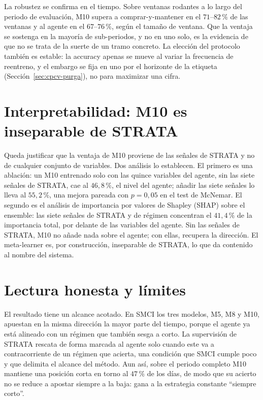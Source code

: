 La robustez se confirma en el tiempo. Sobre ventanas rodantes a lo largo del periodo de evaluación, M10 supera a comprar-y-mantener en el $71$--$82\,\%$ de las ventanas y al agente en el $67$--$76\,\%$, según el tamaño de ventana. Que la ventaja se sostenga en la mayoría de sub-periodos, y no en uno solo, es la evidencia de que no se trata de la suerte de un tramo concreto. La elección del protocolo también es estable: la accuracy apenas se mueve al variar la frecuencia de reentreno, y el embargo se fija en uno por el horizonte de la etiqueta (Sección~\ref{sec:cpcv-purga}), no para maximizar una cifra.


\section{Interpretabilidad: M10 es inseparable de STRATA}
\label{sec:interpretabilidad}

Queda justificar que la ventaja de M10 proviene de las señales de STRATA y no de cualquier conjunto de variables. Dos análisis lo establecen. El primero es una ablación: un M10 entrenado solo con las quince variables del agente, sin las siete señales de STRATA, cae al $46{,}8\,\%$, el nivel del agente; añadir las siete señales lo lleva al $55{,}2\,\%$, una mejora pareada con $p = 0{,}05$ en el test de McNemar. El segundo es el análisis de importancia por valores de Shapley (SHAP) \cite{lundberg2017} sobre el ensemble: las siete señales de STRATA y de régimen concentran el $41{,}4\,\%$ de la importancia total, por delante de las variables del agente. Sin las señales de STRATA, M10 no añade nada sobre el agente; con ellas, recupera la dirección. El meta-learner es, por construcción, inseparable de STRATA, lo que da contenido al nombre del sistema.


\section{Lectura honesta y límites}
\label{sec:lectura}

El resultado tiene un alcance acotado. En SMCI los tres modelos, M5, M8 y M10, apuestan en la misma dirección la mayor parte del tiempo, porque el agente ya está alineado con un régimen que también sesga a corto. La supervisión de STRATA rescata de forma marcada al agente solo cuando este va a contracorriente de un régimen que acierta, una condición que SMCI cumple poco y que delimita el alcance del método. Aun así, sobre el periodo completo M10 mantiene una posición corta en torno al $47\,\%$ de los días, de modo que su acierto no se reduce a apostar siempre a la baja: gana a la estrategia constante ``siempre corto''.

